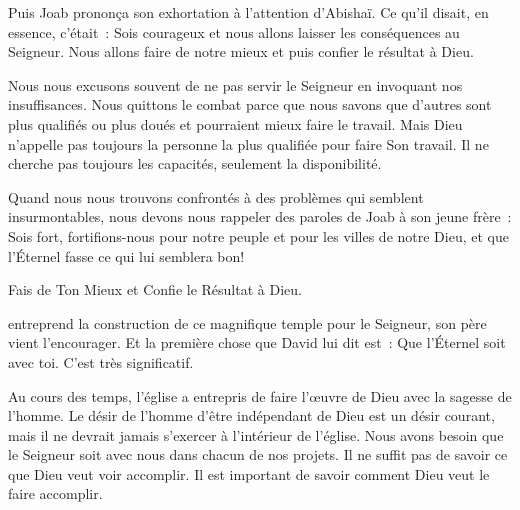 Puis Joab prononça son exhortation à l'attention d'Abishaï.
 Ce qu'il disait, en essence, c'était~:
 \og Sois courageux et nous allons laisser les conséquences au Seigneur.
 Nous allons faire de notre mieux et puis confier le résultat à Dieu. \fg{}


Nous nous excusons souvent de ne pas servir le Seigneur
 en invoquant nos insuffisances. Nous quittons le combat parce que nous savons
 que d'autres sont plus qualifiés ou plus doués
 et pourraient mieux faire le travail.
 Mais Dieu n'appelle pas toujours la personne la plus qualifiée
 pour faire Son travail. Il ne cherche pas toujours les capacités,
 seulement la disponibilité. 

Quand nous nous trouvons confrontés à des problèmes
 qui semblent insurmontables, nous devons nous rappeler des paroles de Joab
 à son jeune frère~:
 \og Sois fort, fortifions-nous pour notre peuple
 et pour les villes de notre Dieu,
 et que l'Éternel fasse ce qui lui semblera bon! \fg{}

Fais de Ton Mieux et Confie le Résultat à Dieu. 

\dvrule






 entreprend la construction
 de ce magnifique temple pour le Seigneur, son père vient l'encourager.
 Et la première chose que David lui dit est~:
 \og Que l'Éternel soit avec toi. \fg{} C'est très significatif. 

Au cours des temps, l'église 
 a entrepris de faire l'\oe{}uvre de Dieu
 avec la sagesse de l'homme. Le désir de l'homme d'être indépendant de Dieu
 est un désir courant, mais il ne devrait jamais s'exercer
 à l'intérieur de l'église.
 Nous avons besoin que le Seigneur soit avec nous dans chacun de nos projets.
 Il ne suffit pas de savoir ce que Dieu veut voir accomplir.
 Il est important de savoir comment Dieu veut le faire accomplir. 

